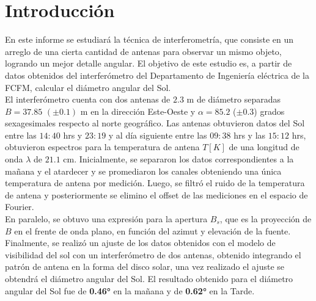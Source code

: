 \documentclass[letterpaper,oneside]{article}
\begin{document}
	
\templatePortrait

\templatePagecfg

\templateFinalcfg


\section{Introducción}
En este informe se estudiará la técnica de interferometría, que consiste en un arreglo de una cierta cantidad de antenas para observar un mismo objeto, logrando un mejor detalle angular. El objetivo de este estudio es, a partir de datos obtenidos del interferómetro del Departamento de Ingeniería eléctrica de la FCFM, calcular el diámetro angular del Sol.\\

El interferómetro cuenta con dos antenas de $2.3$ m de diámetro separadas $B = 37.85$ $(\pm 0.1)$ m en la dirección Este-Oeste  y $\alpha = 85.2$ ($\pm 0.3$) grados sexagesimales respecto al norte geográfico. Las antenas obtuvieron datos del Sol entre las $14:40$ hrs y $23:19$ y al día siguiente entre las $09:38$ hrs y las $15:12$ hrs, obtuvieron espectros para la temperatura de antena $T [K]$ de una longitud de onda $\lambda$ de $21.1$ cm. Inicialmente, se separaron los datos correspondientes a la mañana y el atardecer y se promediaron los canales obteniendo una única temperatura de antena por medición. Luego, se filtró el ruido de la temperatura de antena y posteriormente se elimino el offset de las mediciones en el espacio de Fourier.\\

En paralelo, se obtuvo una expresión para la apertura $B_s$, que es la proyección de $B$ en el frente de onda plano, en función del azimut y elevación de la fuente.\\

Finalmente, se realizó un ajuste de los datos obtenidos con el modelo de visibilidad del sol con un interferómetro de dos antenas, obtenido integrando el patrón de antena en la forma del disco solar, una vez realizado el ajuste se obtendrá el diámetro angular del Sol. El resultado obtenido para el diámetro angular del Sol fue de \textbf{0.46°} en la mañana y de \textbf{0.62°} en la Tarde.
\end{document}
